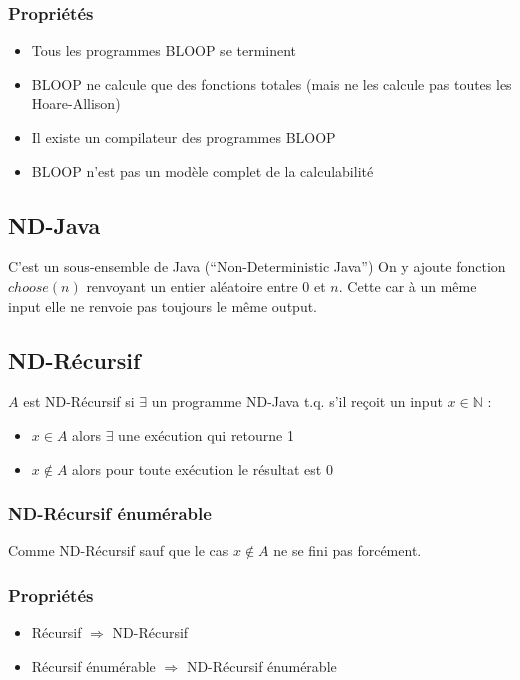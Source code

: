 \subsubsection{Propriétés}

\begin{itemize}
\item Tous les programmes BLOOP se terminent
\item BLOOP ne calcule que des fonctions totales (mais ne les calcule pas toutes les Hoare-Allison)
\item Il existe un compilateur des programmes BLOOP
\item BLOOP n'est pas un modèle complet de la calculabilité
\end{itemize}

\subsection{ND-Java}

C’est un sous-ensemble de Java (“Non-Deterministic Java”)
On y ajoute fonction $choose(n)$ renvoyant un entier aléatoire entre 0 et $n$. Cette  car à un même input elle ne renvoie pas toujours le même output.

\subsection{ND-Récursif}

$A$ est ND-Récursif si $\exists$ un programme ND-Java t.q. s'il reçoit un input $x \in \mathbb{N}$ :
\begin{itemize}
\item $x \in A$ alors $\exists$ une exécution qui retourne 1
\item $x \notin A$ alors pour toute exécution le résultat est 0
\end{itemize}

\subsubsection{ND-Récursif énumérable}

Comme ND-Récursif sauf que le cas $x \notin A$ ne se fini pas forcément.

\subsubsection{Propriétés}

\begin{itemize}
\item Récursif $\Rightarrow$ ND-Récursif
\item Récursif énumérable $\Rightarrow$ ND-Récursif énumérable
\end{itemize}

